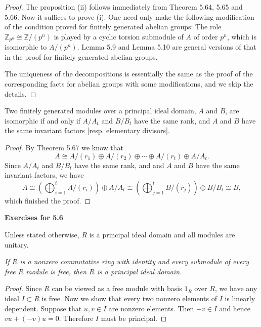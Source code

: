\begin{proof}
The proposition (ii) follows immediately from Theorem 5.64, 5.65 and 5.66. Now it suffices to prove (i). One need only make the following modification of the condition proved for finitely generated abelian groups: The role $\mathbb{Z}_{p^n}\cong\mathbb{Z}/(p^n)$ is played by a cyclic torsion submodule of $A$ of order $p^n$, which is isomorphic to $A/(p^n)$. Lemma 5.9 and Lemma 5.10 are general versions of that in the proof for finitely generated abelian groups.\par
The uniqueness of the decompositions is essentially the same as the proof of the corresponding facts for abelian groups with some modifications, and we skip the details.
\end{proof}
\begin{corollary}
Two finitely generated modules over a principal ideal domain, $A$ and $B$, are isomorphic if and only if $A/A_t$ and $B/B_t$ have the same rank, and $A$ and $B$ have the same invariant factors [resp. elementary divisors].
\end{corollary}
\begin{proof}
By Theorem 5.67 we know that 
$$
A\cong A/\left( r_1 \right) \oplus A/\left( r_2 \right) \oplus \cdots \oplus A/\left( r_t \right) \oplus A/A_t.
$$
Since $A/A_t$ and $B/B_t$ have the same rank, and  and $A$ and $B$ have the same invariant factors, we have 
$$
A\cong \left( \bigoplus_{i=1}^t{A/\left( r_i \right)} \right) \oplus A/A_t\cong \left( \bigoplus_{j=1}^t{B/\left( r_j \right)} \right) \oplus B/B_t\cong B,
$$
which finished the proof.
\end{proof}
\begin{center}
\begin{large}
    \textbf{Exercises for 5.6}
\end{large}
\end{center}
Unless stated otherwise, $R$ is a principal ideal domain and all modules are unitary.\par
\begin{problem}\em
If $R$ is a nonzero commutative ring with identity and every submodule of every free $R$ module is free, then $R$ is a principal ideal domain.
\end{problem}
\begin{proof}
Since $R$ can be viewed as a free module with basis $1_R$ over $R$, we have any ideal $I\subset R$ is free. Now we show that every two nonzero elements of $I$ is linearly dependent. Suppose that $u,v\in I$ are nonzero elements. Then $-v\in I$ and hence $vu+(-v)u=0$. Therefore $I$ must be principal.
\end{proof}

